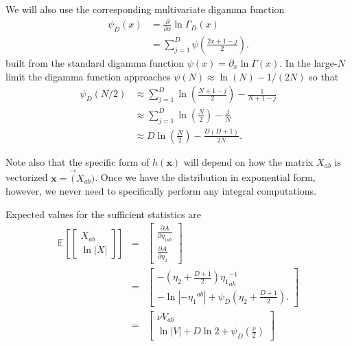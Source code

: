 \documentclass[aps,showpacs,twocolumn,prd,superscriptaddress,nofootinbib]{revtex4}
\newcommand{\nn}{\nonumber}
\newcommand{\E}[1]{{\mathbb E}_{#1}\!}
\begin{document}
We will also use the corresponding multivariate digamma function
\begin{align}
\psi_D\left(x\right)&=\frac\partial{\partial x}\ln\Gamma_D\left(x\right)\\
&=\sum_{j=1}^D{\psi\left(\frac{2x+1-j}2\right)}. 
\end{align}
built from the standard digamma function $\psi(x)=\partial_x\ln\Gamma(x)$.
In the large-$N$ limit the digamma function approaches
$\psi(N)\approx \ln(N)-1/(2N)$ so that 
\begin{align}
  \psi_D\left(N/2\right)
  &\approx\sum_{j=1}^D{\ln\left(\frac{N+1-j}2\right)-\frac1{N+1-j}}\nn\\
  &\approx\sum_{j=1}^D{\ln\left(\frac{N}2\right)-\frac{j}N}\nn\\
  &\approx D\ln\left(\frac{N}2\right)-\frac{D(D+1)}{2N}.
\end{align}


Note also that the specific form of $h(\bm x)$ will depend on how the matrix $X_{ab}$ is vectorized $\bm x=\vec(X_{ab})$.  Once we have the distribution in exponential form, however, we never need to specifically perform any integral computations.

Expected values for the sufficient statistics are
\begin{eqnarray*}
\E{}\left[ 
\begin{bmatrix}
  X_{ab}\\[.7ex]
  \ln\left|X\right|
\end{bmatrix}
\right]
&=&
\begin{bmatrix}
  \frac{\partial A}{\partial\eta_{1ab}}\\[.7ex]
  \frac{\partial A}{\partial\eta_{2}}  
\end{bmatrix}\\
&=&
\begin{bmatrix}
-\left(\eta_2+\frac{D+1}2\right){\eta_1}^{-1}_{ab}\\[.7ex]
-\ln\left|{-{\eta_1}^{ab}}\right|+\psi_D\left(\eta_2+\frac{D+1}2\right).
\end{bmatrix}\\
&=&
\begin{bmatrix}
  \nu V_{ab}\\[0ex]
  \ln|V|+D\ln2+\psi_D\left(\frac\nu2\right)
\end{bmatrix}
\end{eqnarray*}
\end{document}

